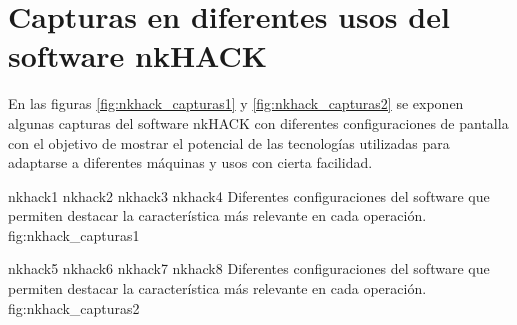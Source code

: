 
\chapter{Capturas en diferentes usos del software nkHACK}
\label{AppendixB}

En las figuras \ref{fig:nkhack_capturas1} y \ref{fig:nkhack_capturas2} se exponen algunas capturas del software nkHACK con diferentes configuraciones de pantalla con el objetivo de mostrar el potencial de las tecnologías utilizadas para adaptarse a diferentes máquinas y usos con cierta facilidad.

\subfiggridfour
   {nkhack1}
   {nkhack2}
   {nkhack3}
   {nkhack4}
   {Diferentes configuraciones del software que permiten destacar la característica más relevante en cada operación.}
   {fig:nkhack_capturas1}

\subfiggridfour
   {nkhack5}
   {nkhack6}
   {nkhack7}
   {nkhack8}
   {Diferentes configuraciones del software que permiten destacar la característica más relevante en cada operación.}
   {fig:nkhack_capturas2}

